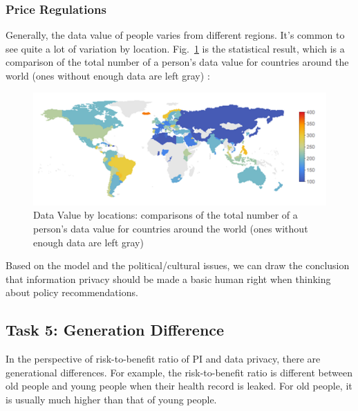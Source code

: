 \documentclass{mcmthesis}
\begin{document}
\subsubsection{Price Regulations}
Generally, the data value of people varies from different regions. It's common to see quite a lot of variation by location. Fig.~\ref{fig:datavalue} is the statistical result, which is a comparison of the total number of a person's data value for countries around the world (ones without enough data are left gray) \cite{gkatzelis2015pricing}:
\begin{figure}
\begin{center}
\includegraphics[width=0.9\linewidth]{fig/geoplot.png}
\caption{Data Value by locations: comparisons of the total number of a person's data value for countries around the world (ones without enough data are left gray)}
\label{fig:datavalue}
\end{center}
\end{figure}





Based on the model and the political/cultural issues, we can draw the conclusion that information privacy should be made a basic human right when thinking about policy recommendations.

\subsection{Task 5: Generation Difference}

In the perspective of risk-to-benefit ratio of PI and data privacy, there are generational differences. For example, the risk-to-benefit ratio is different between old people and young people when their health record is leaked. For old people, it is usually much higher than that of young people. 
\end{document}
